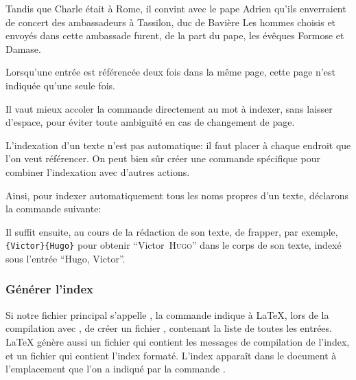 \begin{latexcode}
Tandis que Charle était à Rome, il convint
avec le pape Adrien qu’ils enverraient de concert
des ambassadeurs à Tassilon, duc de Bavière
\textelp{}
Les hommes choisis et envoyés dans cette ambassade furent, de 
la part du pape, les évêques Formose et 
Damase\textelp{}.
\end{latexcode}



Lorsqu'une entrée est référencée deux fois dans la même page, cette page n'est indiquée qu'une seule fois. 

\begin{attention}
Il vaut mieux accoler la commande  directement au  mot à indexer, sans laisser d'espace, pour éviter toute ambiguïté en cas de changement de page.
\end{attention}


L'indexation d'un texte n'est pas automatique: il faut placer  à chaque endroit  que l'on veut référencer. On  peut bien sûr créer une commande  spécifique pour combiner l'indexation avec d'autres actions.

Ainsi, pour indexer automatiquement tous les noms propres d'un texte, déclarons la commande suivante:\label{indexauteur}

\begin{latexcode}
\newcommand\auteur[2]{#1~\textsc{#2}\index{#2, #1}\xspace}
\end{latexcode}

\renewcommand\auteur[2]{#1~\textsc{#2}\xspace}

Il suffit ensuite, au cours de la rédaction de son texte, de frapper, par exemple, \verb|{Victor}{Hugo}| pour obtenir \enquote{\auteur{Victor}{Hugo}} dans le corps de son texte, indexé sous l'entrée \enquote{Hugo, Victor}.


\subsubsection{Générer l'index}

Si notre fichier principal s'appelle ,  la commande  indique à \LaTeX{}, lors de la compilation avec \XeLaTeX, de créer un fichier , contenant la liste de toutes les entrées. 
\LaTeX{} génère aussi un fichier  qui contient les messages de compilation de l'index, et un fichier  qui contient l'index formaté.
L'index  apparaît dans le document à l'emplacement que l'on a indiqué par la commande .

